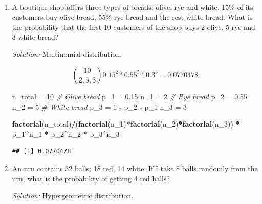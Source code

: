 \documentclass[]{book}
\newenvironment{Shaded}{\begin{snugshade}}{\end{snugshade}}
\newcommand{\CommentTok}[1]{\textcolor[rgb]{0.56,0.35,0.01}{\textit{#1}}}
\newcommand{\DecValTok}[1]{\textcolor[rgb]{0.00,0.00,0.81}{#1}}
\newcommand{\FloatTok}[1]{\textcolor[rgb]{0.00,0.00,0.81}{#1}}
\newcommand{\KeywordTok}[1]{\textcolor[rgb]{0.13,0.29,0.53}{\textbf{#1}}}
\newcommand{\NormalTok}[1]{#1}
\newcommand{\OperatorTok}[1]{\textcolor[rgb]{0.81,0.36,0.00}{\textbf{#1}}}
\newcommand{\StringTok}[1]{\textcolor[rgb]{0.31,0.60,0.02}{#1}}
\theoremstyle{definition}
\theoremstyle{definition}
\theoremstyle{definition}
\theoremstyle{remark}
\begin{document}
\begin{enumerate}
\def\labelenumi{\arabic{enumi}.}
\item
  A boutique shop offers three types of breads; olive, rye and white.
  15\% of its customers buy olive bread, 55\% rye bread and the rest
  white bread. What is the probability that the first 10 customers of
  the shop buys 2 olive, 5 rye and 3 white bread?

  \emph{Solution:} Multinomial distribution.

  \[\binom{10}{2,5,3} 0.15^2 * 0.55^5 * 0.3^3 = 0.0770478\]

\begin{Shaded}
\begin{Highlighting}[]
\NormalTok{n_total =}\StringTok{ }\DecValTok{10}
\CommentTok{# Olive bread}
\NormalTok{p_}\DecValTok{1}\NormalTok{ =}\StringTok{ }\FloatTok{0.15}
\NormalTok{n_}\DecValTok{1}\NormalTok{ =}\StringTok{ }\DecValTok{2}
\CommentTok{# Rye bread}
\NormalTok{p_}\DecValTok{2}\NormalTok{ =}\StringTok{ }\FloatTok{0.55}
\NormalTok{n_}\DecValTok{2}\NormalTok{ =}\StringTok{ }\DecValTok{5}
\CommentTok{# White bread}
\NormalTok{p_}\DecValTok{3}\NormalTok{ =}\StringTok{ }\DecValTok{1} \OperatorTok{-}\StringTok{ }\NormalTok{p_}\DecValTok{2} \OperatorTok{-}\StringTok{ }\NormalTok{p_}\DecValTok{1}
\NormalTok{n_}\DecValTok{3}\NormalTok{ =}\StringTok{ }\DecValTok{3}

\KeywordTok{factorial}\NormalTok{(n_total)}\OperatorTok{/}\NormalTok{(}\KeywordTok{factorial}\NormalTok{(n_}\DecValTok{1}\NormalTok{)}\OperatorTok{*}\KeywordTok{factorial}\NormalTok{(n_}\DecValTok{2}\NormalTok{)}\OperatorTok{*}\KeywordTok{factorial}\NormalTok{(n_}\DecValTok{3}\NormalTok{)) }\OperatorTok{*}\StringTok{ }\NormalTok{p_}\DecValTok{1}\OperatorTok{^}\NormalTok{n_}\DecValTok{1} \OperatorTok{*}\StringTok{ }\NormalTok{p_}\DecValTok{2}\OperatorTok{^}\NormalTok{n_}\DecValTok{2} \OperatorTok{*}\StringTok{ }\NormalTok{p_}\DecValTok{3}\OperatorTok{^}\NormalTok{n_}\DecValTok{3}
\end{Highlighting}
\end{Shaded}

\begin{verbatim}
## [1] 0.0770478
\end{verbatim}
\item
  An urn contains 32 balls; 18 red, 14 white. If I take 8 balls randomly
  from the urn, what is the probability of getting 4 red balls?

  \emph{Solution:} Hypergeometric distribution.


\end{enumerate}
\end{document}
